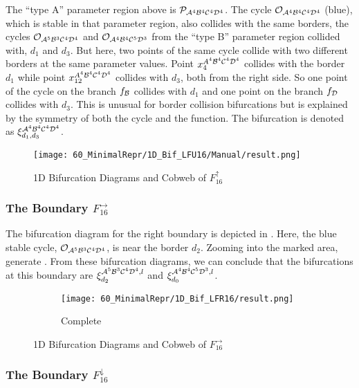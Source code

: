 The ``type A'' parameter region above is $\mathcal{P}_{\mathcal{A}^4\mathcal{B}^4\mathcal{C}^4\mathcal{D}^4}$.
The cycle $\mathcal{O}_{\mathcal{A}^4\mathcal{B}^4\mathcal{C}^4\mathcal{D}^4}$ (blue), which is stable in that parameter region, also collides with the same borders, the cycles $\mathcal{O}_{\mathcal{A}^5\mathcal{B}^3\mathcal{C}^4\mathcal{D}^4}$ and $\mathcal{O}_{\mathcal{A}^4\mathcal{B}^4\mathcal{C}^5\mathcal{D}^3}$ from the ``type B'' parameter region collided with, $d_1$ and $d_3$.
But here, two points of the same cycle collide with two different borders at the same parameter values.
Point $x_{4}^{A^4\mathcal{B}^4\mathcal{C}^4\mathcal{D}^4}$ collides with the border $d_1$ while point $x_{12}^{A^4\mathcal{B}^4\mathcal{C}^4\mathcal{D}^4}$ collides with $d_3$, both from the right side.
So one point of the cycle on the branch $f_{\mathcal{B}}$ collides with $d_1$ and one point on the branch $f_{\mathcal{D}}$ collides with $d_3$.
This is unusual for border collision bifurcations but is explained by the symmetry of both the cycle and the function.
The bifurcation is denoted as $\xi_{d_1, d_3}^{\mathcal{A}^4\mathcal{B}^4\mathcal{C}^4\mathcal{D}^4}$.

\begin{figure}
    \centering
    \texttt{[image: 60\_MinimalRepr/1D\_Bif\_LFU16/Manual/result.png]}
    \label{fig:final.bifurcation.F.up}
    \caption{1D Bifurcation Diagrams and Cobweb of $F_{16}^\uparrow$}
\end{figure}

\subsubsection{The Boundary $F_{16}^\rightarrow$}

The bifurcation diagram for the right boundary is depicted in .
Here, the blue stable cycle, $\mathcal{O}_{\mathcal{A}^5\mathcal{B}^3\mathcal{C}^4\mathcal{D}^4}$, is near the border $d_2$.
Zooming into the marked area, generate .
From these bifurcation diagrams, we can conclude that the bifurcations at this boundary are $\xi_{d_2}^{\mathcal{A}^5\mathcal{B}^3\mathcal{C}^4\mathcal{D}^4, l}$ and $\xi_{d_0}^{\mathcal{A}^4\mathcal{B}^4\mathcal{C}^5\mathcal{D}^3, l}$.

\begin{figure}
    \centering
    \begin{subfigure}{0.4\textwidth}
        \centering
        \texttt{[image: 60\_MinimalRepr/1D\_Bif\_LFR16/result.png]}
        \caption{Complete}
        \label{fig:final.bifurcation.F.right}
    \end{subfigure}
    \caption{1D Bifurcation Diagrams and Cobweb of $F_{16}^\rightarrow$}
\end{figure}

\subsubsection{The Boundary $F_{16}^\downarrow$}

